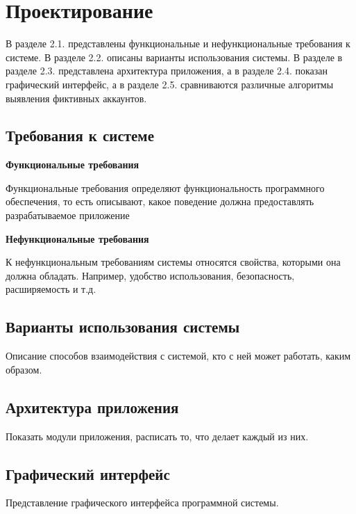 \usepackage{slashbox,pict2e}
\newpage
\section{Проектирование}
\label{sec:designing}
В разделе 2.1. представлены функциональные и нефункциональные требования к системе. В разделе 2.2. описаны варианты использования системы. В разделе в разделе 2.3. представлена архитектура приложения, а в разделе 2.4. показан графический интерфейс, а в разделе 2.5. сравниваются различные алгоритмы выявления фиктивных аккаунтов.

\vspace{1.5em}
\subsection{Требования к системе}
\label{subsec:fotmalDefinition}
\textbf{Функциональные требования}

Функциональные требования определяют функциональность программного обеспечения, то есть описывают, какое поведение должна предоставлять разрабатываемое приложение

\textbf{Нефункциональные требования}

К нефункциональным требованиям системы относятся свойства, которыми она должна обладать. Например, удобство использования, безопасность, расширяемость и т.д.

\vspace{1.5em}
\subsection{Варианты использования системы}
\label{subsec:Variants}
Описание способов взаимодействия с системой, кто с ней может работать, каким образом.

\vspace{1.5em}
\subsection{Архитектура приложения}
\label{subsec:Architecture}
Показать модули приложения, расписать то, что делает каждый из них.

\vspace{1.5em}
\subsection{Графический интерфейс}
\label{subsec:Graphic}
Представление графического интерфейса программной системы.

